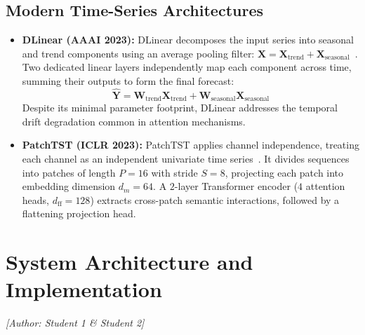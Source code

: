 \documentclass[11pt,a4paper]{article}
\begin{document}
\subsection{Modern Time-Series Architectures}
\begin{itemize}
    \item \textbf{DLinear (AAAI 2023):} DLinear decomposes the input series into seasonal and trend components using an average pooling filter: $\mathbf{X} = \mathbf{X}_{\text{trend}} + \mathbf{X}_{\text{seasonal}}$~\cite{zeng2023transformers}. Two dedicated linear layers independently map each component across time, summing their outputs to form the final forecast:
    \begin{equation}
        \hat{\mathbf{Y}} = \mathbf{W}_{\text{trend}} \mathbf{X}_{\text{trend}} + \mathbf{W}_{\text{seasonal}} \mathbf{X}_{\text{seasonal}}
    \end{equation}
    Despite its minimal parameter footprint, DLinear addresses the temporal drift degradation common in attention mechanisms.
    \item \textbf{PatchTST (ICLR 2023):} PatchTST applies channel independence, treating each channel as an independent univariate time series~\cite{nie2023time}. It divides sequences into patches of length $P=16$ with stride $S=8$, projecting each patch into embedding dimension $d_m=64$. A $2$-layer Transformer encoder ($4$ attention heads, $d_{\text{ff}}=128$) extracts cross-patch semantic interactions, followed by a flattening projection head.
\end{itemize}

\section{System Architecture and Implementation}
\label{sec:implementation}
\noindent\textit{[Author: Student 1 \& Student 2]}
\end{document}
